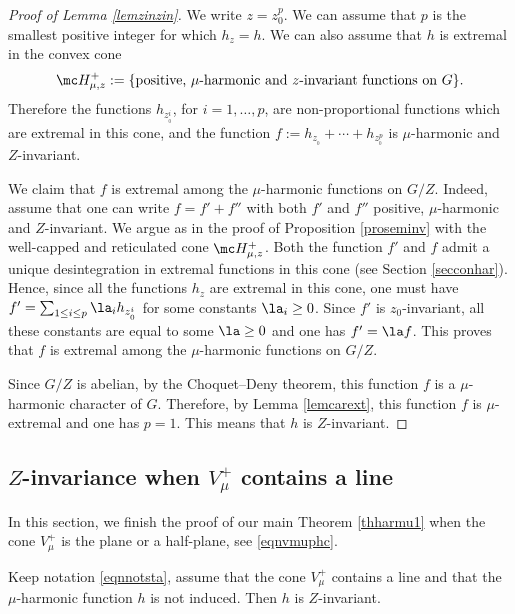 \begin{proof}[Proof of Lemma \ref{lemzinzin}]
We write $z=z_0^p$. We can assume that $p$
is the smallest positive integer for which $h_z=h$.
We can also assume that $h$ is extremal in the
convex cone
\[
\mc H_{\mu,z}^+:=\{
\text{positive, $\mu$-harmonic and $z$-invariant functions on $G$}\}.
\]
Therefore the functions $h_{z_{_0}^i}$, for $i=1,\ldots, p$,
are non-proportional functions which are extremal
in this cone,
and the function $f:= h_{z_{_0}} +\cdots + h_{z_{_0}^{p}}$ is
$\mu$-harmonic and $Z$-invariant.

We claim that $f$ is extremal
among the $\mu$-harmonic functions on $G/Z$.
Indeed, assume that one can write $f=f'+f''$ with both $f'$ and $f''$
positive, $\mu$-harmonic and $Z$-invariant.
We argue as in the proof of Proposition \ref{proseminv}
with the well-capped and reticulated cone $\mc H_{\mu,z}^+$.
Both the function $f'$ and $f$
admit a unique desintegration in extremal functions in this cone
(see Section \ref{secconhar}).
Hence, since all the functions $h_z$ are extremal in this cone,
one must have $f'=\sum_{1\leq i\leq p} \la_i h_{z_{_0}^i}$
for some constants $\la_i\geq 0$. Since $f'$ is $z_0$-invariant,
all these constants are equal to some $\la\geq 0$ and one has $f'=\la f$.
This proves that $f$ is extremal
among the $\mu$-harmonic functions on $G/Z$.

Since $G/Z$ is abelian, by the Choquet--Deny theorem, this function $f$
is a $\mu$\nobreakdash-har\-monic character of $G$.
Therefore, by Lemma \ref{lemcarext}, this function $f$ is $\mu$-extremal
and one has $p=1$. This means that $h$ is $Z$-invariant.
\end{proof}

\subsection{$Z$-invariance when $V^+_\mu$ contains a line}
\label{secvmulin}

\bq
In this section, we finish the proof of our main Theorem
\ref{thharmu1}
when the cone $V_\mu^+$ is the plane or a half-plane,
see \eqref{eqnvmuphc}.
\eq

\begin{Prop}

\label{provmulin1}
Keep notation \eqref{eqnnotsta}, assume that
the cone $V^+_\mu$ contains a line and
that the $\mu$-harmonic function $h$ is not induced. Then
$h$ is $Z$-invariant.
\end{Prop}

